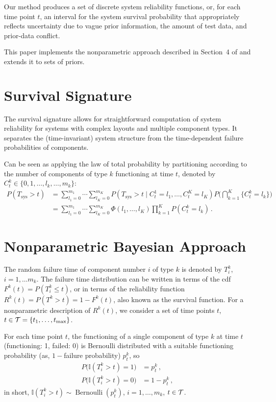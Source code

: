 \documentclass[authoryear, 12pt, a4paper]{elsarticle}
\def\Tsys{T_\text{sys}}
\newcommand{\indic}{\mathbb{I}}
\newcommand{\ber}{\operatorname{Bernoulli}}
\def\tmax{t_\text{max}}
\begin{document}
Our method produces a set of discrete system reliability functions,
or, for each time point $t$, an interval for the system survival probability
that appropriately reflects uncertainty due to vague prior information, the amount of test data, and prior-data conflict.

This paper implements the nonparametric approach described in Section~4 of \citet{2015:bayessurvsign}
and extends it to sets of priors.

\section{Survival Signature}

The survival signature allows for straightforward computation of system reliability
for systems with complex layouts and multiple component types.
It separates the (time-invariant) system structure from the time-dependent failure probabilities of components.

Can be seen as applying the law of total probability by partitioning
according to the number of components of type $k$ functioning at time $t$,
denoted by $C^k_t \in \{0, 1, \ldots, l_k, \ldots, m_k\}$:
\begin{align*}
P(\Tsys > t)
 &= \sum_{l_1=0}^{m_1} \cdots \sum_{l_K=0}^{m_K} P(\Tsys > t \mid C^1_t = l_1,\ldots, C^K_t = l_K)
                                                 P\Big( \bigcap_{k=1}^K \{ C^k_t = l_k\} \Big) \\
 &= \sum_{l_1=0}^{m_1} \cdots \sum_{l_K=0}^{m_K} \Phi(l_1, \ldots, l_K)
                                                 \prod_{k=1}^K P(C^k_t = l_k) \,.
\end{align*}


\section{Nonparametric Bayesian Approach}

The random failure time of component number $i$ of type $k$ is denoted by $T^k_i$, $i = 1, \ldots m_k$.
The failure time distribution can be written in terms of the cdf $F^k(t) = P(T^k_i \le t)$,
or in terms of the reliability function $R^k(t) = P(T^k > t) = 1 - F^k(t)$,
also known as the survival function.
For a nonparametric description of $R^k(t)$,
we consider a set of time points $t$, $t \in {\cal T} = \{t_1, \ldots, \tmax\}$.

For each time point $t$, the functioning of a single component of type $k$ at time $t$ (functioning: 1, failed: 0)
is Bernoulli distributed with a suitable functioning probability (as, $1-$failure probability) $p^k_t$, so
\begin{align*}
P\big(\indic(T^k_i > t) = 1\big) &= p^k_t\,, \\
P\big(\indic(T^k_i > t) = 0\big) &= 1 - p^k_t\,,
\end{align*}
in short, $\indic(T^k_i > t) \sim \ber(p^k_t)$, $i = 1, \ldots, m_k$, $t \in {\cal T}$.
\end{document}
